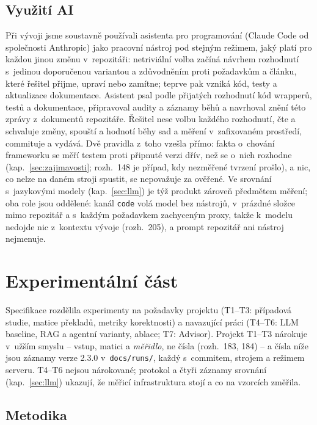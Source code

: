 \documentclass{article}
\begin{document}
\subsection{Využití AI}\label{sec:ai}

Při vývoji jsme soustavně používali asistenta pro programování (Claude Code od společnosti Anthropic) jako pracovní nástroj pod stejným režimem, jaký platí pro každou jinou změnu v~repozitáři: netriviální volba začíná návrhem rozhodnutí s~jedinou doporučenou variantou a zdůvodněním proti požadavkům a článku, které řešitel přijme, upraví nebo zamítne; teprve pak vzniká kód, testy a aktualizace dokumentace. Asistent psal podle přijatých rozhodnutí kód wrapperů, testů a dokumentace, připravoval audity a záznamy běhů a navrhoval znění této zprávy z~dokumentů repozitáře. Řešitel nese volbu každého rozhodnutí, čte a schvaluje změny, spouští a hodnotí běhy sad a měření v~zafixovaném prostředí, commituje a vydává. Dvě pravidla z~toho vzešla přímo: fakta o~chování frameworku se měří testem proti připnuté verzi dřív, než se o~nich rozhodne (kap.~\ref{sec:zajimavosti}; rozh.~148 je případ, kdy nezměřené tvrzení prošlo), a nic, co nelze na daném stroji spustit, se nepovažuje za ověřené. Ve srovnání s~jazykovými modely (kap.~\ref{sec:llm}) je týž produkt zároveň předmětem měření; oba role jsou oddělené: kanál \texttt{code} volá model bez nástrojů, v~prázdné složce mimo repozitář a s~každým požadavkem zachyceným proxy, takže k~modelu nedojde nic z~kontextu vývoje (rozh.~205), a prompt repozitář ani nástroj nejmenuje.
\section{Experimentální část}\label{sec:exp}

Specifikace rozdělila experimenty na požadavky projektu (T1--T3: případová studie, matice překladů, metriky korektnosti) a navazující práci (T4--T6: LLM baseline, RAG a agentní varianty, ablace; T7: Advisor). Projekt T1--T3 nárokuje v~užším smyslu -- vstup, matici a \emph{měřidlo}, ne čísla (rozh.~183, 184) -- a čísla níže jsou záznamy verze 2.3.0 v~\texttt{docs/runs/}, každý s~commitem, strojem a režimem serveru. T4--T6 nejsou nárokované; protokol a čtyři záznamy srovnání (kap.~\ref{sec:llm}) ukazují, že měřicí infrastruktura stojí a co na vzorcích změřila.

\subsection{Metodika}
\end{document}
